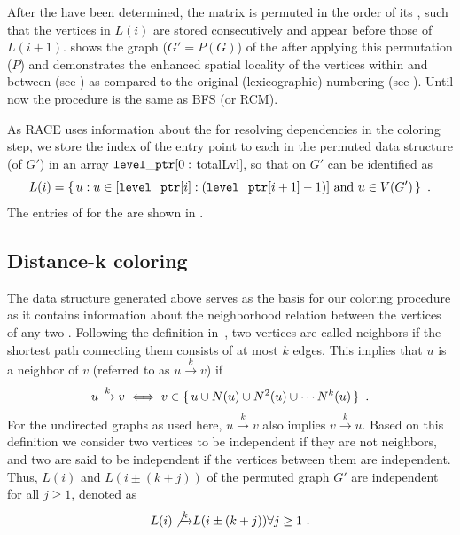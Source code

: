 
After the \levels have been determined, the matrix is permuted in the
order of its \levels, such that the vertices in $L(i)$ are stored
consecutively and appear before those of
$L(i+1)$.  shows the graph ($G' = P(G)$)
of the \stex after applying this permutation ($P$) and demonstrates
the enhanced spatial locality of the vertices within and between
\levels (see ) as compared to the original
(lexicographic) numbering (see ).
Until now the procedure is the same as \acrshort{BFS} (or
\acrshort{RCM}).

As \acrshort{RACE} uses information about the \levels for resolving
dependencies in the coloring step, we store the index of the entry point to each
\level in the permuted data structure (of $G'$) in an array
${\tt level\_ptr}[0:$ \acrshort{totalLvl}$]$, so that \levels on $G'$ can be
identified as
\begin{equation*}
  L(i) = \set{ u : u \in [\levelPtr[i]:(\levelPtr[i+1]-1)]
    \text{ and } u \in V(G')}\eos
\end{equation*}
The entries of \levelPtr for the \stex are shown in . 
 
\subsection{Distance-k coloring} \label{subsec:DK}

The data structure generated above serves as the basis for our \DK coloring
procedure as it contains information about the neighborhood relation
between the vertices of any two \levels. Following the definition
in~\cite{dist_k_def}, two vertices are called \DK neighbors if the
shortest path connecting them consists of at most $k$ edges.
This implies that $u$ is a \DK neighbor of $v$ (referred to as
$u\xrightarrow{k}v$) if
\begin{equation}\label{eq:dk}
  u\xrightarrow{k}v  \iff  v \in \set{ u \cup N(u) \cup N^2(u) \cup \cdots N^k(u) }~.
\end{equation}
For the undirected graphs as used here, $u\xrightarrow{k}v$
also implies $v\xrightarrow{k}u$. Based on this definition we consider
two vertices to be \DK independent if they are not \DK
neighbors, and two \levels are said to be \DK independent if the vertices between them are \DK independent. Thus, \levels $L(i)$ and $L(i\pm(k+j))$ of the permuted
graph $G'$ are \DK independent for all $j\geq1$, denoted as
\begin{equation}\label{corollary_dk}
	L(i) \not{\xrightarrow{k}} L(i\pm(k+j)) \forall j\geq1 ~.
\end{equation} 


